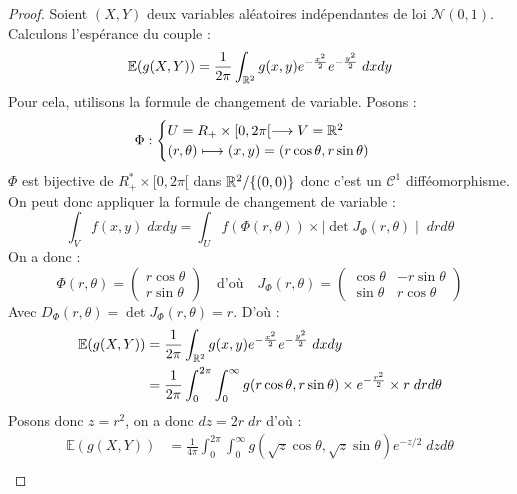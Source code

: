 \begin{proof}
    Soient $(X,Y)$ deux variables aléatoires indépendantes de loi $ \mathcal{N}(0,1)$. Calculons l'espérance 
    du couple : 
        $$ \mathbb{E}(g(X,Y)) = \frac{1}{2 \pi} \int_{\mathbb{R}^2} g(x,y) e^{ - \frac{x^2}{2}} e^{ - \frac{y^2}{2}} \; dx dy $$ 
    Pour cela, utilisons la formule de changement de variable. Posons : 
        $$ \Phi : 
            \begin{cases}
                U = R_+ \times [0, 2 \pi[ \longrightarrow V = \mathbb{R}^2 \\ 
                (r, \theta) \longmapsto (x,y) = (r \cos \theta, r \sin \theta)
            \end{cases}
        $$ 
    $ \Phi$ est bijective de $ R_+^* \times [0, 2 \pi[$ dans $ \mathbb{R}^2/\{(0,0)\}$ donc c'est un $ \mathcal{C}^1$ difféomorphisme. 
    On peut donc appliquer la formule de changement de variable : 
        $$ \int_V f(x,y) \; dx dy = \int_U f( \Phi(r, \theta)) \times \mid \det J_\Phi (r, \theta) \mid \; dr d \theta $$ 
    On a donc : 
        $$ 
            \Phi (r, \theta) = 
                \begin{pmatrix}
                    r \cos \theta \\ 
                    r \sin \theta
                \end{pmatrix}
            \quad \text{d'où} \quad 
            J_\Phi (r, \theta)=
                \begin{pmatrix}
                    \cos \theta & - r \sin \theta \\ 
                    \sin \theta & r \cos \theta
                \end{pmatrix} 
        $$ 
    Avec $ D_\Phi(r, \theta) = \det J_\Phi(r, \theta) = r$.
    D'où : 
        \begin{align*}
            \mathbb{E}(g(X,Y)) &= \frac{1}{2 \pi} \int_{\mathbb{R}^2} g(x,y) e^{ - \frac{x^2}{2}} e^{ - \frac{y^2}{2}} \; dx dy \\ 
            &= \frac{1}{2 \pi} \int_{0}^{2 \pi} \int_{0}^{\infty} g(r \cos \theta, r \sin \theta) \times e^{- \frac{r^2}{2}} \times r\; dr d \theta \\  
        \end{align*}
    Posons donc $z = r^2$, on a donc $ dz = 2 r \; dr$ d'où :
        \begin{align*}
            \mathbb{E}(g(X,Y)) &= \frac{1}{4 \pi} \int_{0}^{2 \pi} \int_{0}^{\infty} g(\sqrt{z} \cos \theta, \sqrt{z} \sin \theta) e^{- {z}/2} \; dz d \theta \\ 

\end{align*}
\end{proof}
